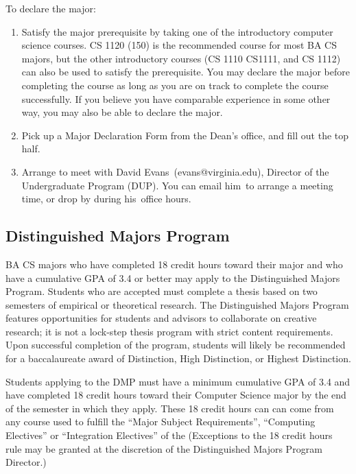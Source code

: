 \documentclass[10pt,letter]{book}
\makeatletter
\newenvironment{numlist}{
\begin{enumerate}
\setlength{\itemsep}{0pt}
\setlength{\parskip}{0pt}}
{\end{enumerate}}
\newcommand{\badup}{David Evans}
\newcommand{\badupemail}{evans@virginia.edu}
\newcommand{\baduppronoun}{his\ } %
\newcommand{\baduppronountwo}{him\ } %
\makeatother
\begin{document}
To declare the major:

\begin{numlist}

\item Satisfy the major prerequisite by taking one of the introductory
  computer science courses. CS 1120 (150) is the recommended course
  for most BA CS majors, but the other introductory courses (CS 1110
  CS1111, and CS 1112) can also be used to satisfy the
  prerequisite. You may declare the major before completing the course
  as long as you are on track to complete the course successfully. If
  you believe you have comparable experience in some other way, you
  may also be able to declare the major.

\item Pick up a Major Declaration Form from the Dean's office, and
  fill out the top half.

\item Arrange to meet with \badup\ (\badupemail), Director of the
  Undergraduate Program (DUP). You can email \baduppronountwo to arrange
  a meeting time, or drop by during \baduppronoun office hours.

\end{numlist}


\subsection{Distinguished Majors Program}


BA CS majors who have completed 18 credit hours toward their major
and who have a cumulative GPA of 3.4 or better may apply to the
Distinguished Majors Program. Students who are accepted must complete
a thesis based on two semesters of empirical or theoretical
research. The Distinguished Majors Program features opportunities for
students and advisors to collaborate on creative research; it is not a
lock-step thesis program with strict content requirements. Upon
successful completion of the program, students will likely be
recommended for a baccalaureate award of Distinction, High
Distinction, or Highest Distinction.

Students applying to the DMP must have a minimum cumulative GPA of 3.4
and have completed 18 credit hours toward their Computer Science
major by the end of the semester in which they apply. These 18 credit
hours can can come from any course used to fulfill the ``Major Subject
Requirements'', ``Computing Electives'' or ``Integration Electives''
of the 
(Exceptions to the 18 credit hours rule may be granted at the
discretion of the Distinguished Majors Program Director.)
\end{document}
